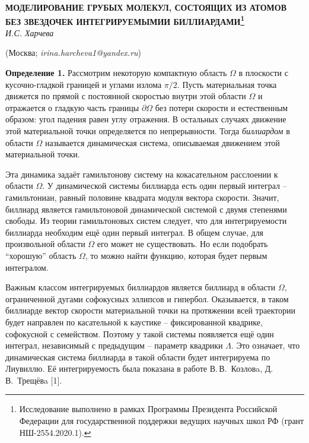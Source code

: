 \begin{center}
    {\bf МОДЕЛИРОВАНИЕ ГРУБЫХ МОЛЕКУЛ, СОСТОЯЩИХ ИЗ АТОМОВ БЕЗ ЗВЕЗДОЧЕК ИНТЕГРИРУЕМЫМИИ БИЛЛИАРДАМИ\footnote{Исследование выполнено в рамках Программы Президента Российской Федерации для государственной поддержки ведущих научных школ РФ (грант НШ-2554.2020.1).}}\\

    {\it И.С. Харчева}

    (Москва; {\it irina.harcheva1@yandex.ru})
\end{center}



\textbf{Определение 1.} {Рассмотрим некоторую компактную область $ \Omega $ в плоскости с кусочно-гладкой границей и углами излома $ \pi/2 $. Пусть материальная точка движется по прямой с постоянной скоростью внутри этой области $ \Omega $ и отражается о гладкую часть границы $ \partial \Omega $ без потери скорости и естественным образом: угол падения равен углу отражения. В остальных случаях движение этой материальной точки определяется по непрерывности. Тогда \textit{биллиардом} в области $ \Omega $ называется динамическая система, описываемая движением этой материальной точки.}

Эта динамика задаёт гамильтонову систему на кокасательном расслоении к области $\Omega$. У динамической системы биллиарда есть один первый интеграл -- гамильтониан, равный половине квадрата модуля вектора скорости. Значит, биллиард является гамильтоновой динамической системой с двумя степенями свободы. Из теории гамильтоновых систем следует, что для интегрируемости биллиарда необходим ещё один первый интеграл. В общем случае, для произвольной области $ \Omega $ его может не существовать. Но если подобрать ``хорошую'' область $ \Omega $, то можно найти функцию, которая будет первым интегралом.

Важным классом интегрируемых биллиардов является биллиард в области $\Omega$, ограниченной дугами софокусных эллипсов и гипербол. Оказывается, в таком биллиарде вектор скорости материальной точки на протяжении всей траектории будет направлен по касательной к каустике -- фиксированной квадрике, софокусной с семейством. Поэтому у такой системы появляется ещё один интеграл, независимый с предыдущим -- параметр квадрики $ \Lambda $. Это означает, что динамическая система биллиарда в такой области будет интегрируема по Лиувиллю. Её интегрируемость была показана в работе В.\,В.~Козловa, Д.\,В.~Трещёвa [1].


